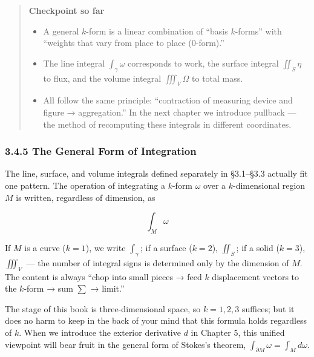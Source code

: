 \documentclass[a4paper,12pt,openany]{book}
\begin{document}
\begin{quote}
\textbf{Checkpoint so far}

\begin{itemize}
\item
  A general \(k\)-form is a linear combination of ``basis \(k\)-forms''
  with ``weights that vary from place to place (\(0\)-form).''
\item
  The line integral \(\int_\gamma \omega\) corresponds to work, the
  surface integral \(\iint_S \eta\) to flux, and the volume integral
  \(\iiint_V \Omega\) to total mass.
\item
  All follow the same principle: ``contraction of measuring device and
  figure → aggregation.'' In the next chapter we introduce pullback —
  the method of recomputing these integrals in different coordinates.
\end{itemize}
\end{quote}

\hypertarget{the-general-form-of-integration}{%
\subsubsection{3.4.5 The General Form of
Integration}\label{the-general-form-of-integration}}

The line, surface, and volume integrals defined separately in §3.1–§3.3
actually fit one pattern. The operation of integrating a \(k\)-form
\(\omega\) over a \(k\)-dimensional region \(M\) is written, regardless
of dimension, as

\[\int_M \omega\]

If \(M\) is a curve (\(k=1\)), we write \(\int_\gamma\); if a surface
(\(k=2\)), \(\iint_S\); if a solid (\(k=3\)), \(\iiint_V\) — the
number of integral signs is determined only by the dimension of \(M\).
The content is always ``chop into small pieces → feed \(k\) displacement
vectors to the \(k\)-form → sum \(\sum\) → limit.''

The stage of this book is three-dimensional space, so \(k=1,2,3\)
suffices; but it does no harm to keep in the back of your mind that this
formula holds regardless of \(k\). When we introduce the exterior
derivative \(d\) in Chapter 5, this unified viewpoint will bear fruit in
the general form of Stokes's theorem,
\(\int_{\partial M} \omega = \int_M d\omega\).

\par\vspace{0.35em}\par
\end{document}
